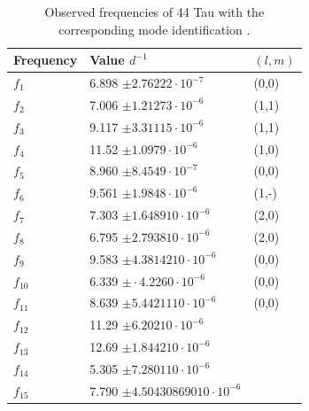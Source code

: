 \begin{table}[htbp]
	\centering
	\caption{Observed frequencies of 44 Tau with the corresponding mode identification \citep{lenz2010delta}. }
	\label{freqs}
\begin{tabular}{lll}
\toprule
  Frequency  &  Value $d^{-1}$  & $(l,m)$ \\ \midrule
$f_1$  & 6.898 $ \pm 2.76222 \cdot 10^{-7}$ & (0,0)    \\
$f_2$  & 7.006 $ \pm 1.21273 \cdot 10^{-6}$ & (1,1)    \\
$f_3$  & 9.117   $ \pm 3.31115 \cdot10^{-6}$ & (1,1)     \\
$f_4$  & 11.52   $ \pm 1.0979 \cdot 10^{-6}$ &  (1,0) \\
$f_5$  & 8.960  $ \pm 8.4549 \cdot 10^{-7}$ & (0,0)     \\
$f_6$  & 9.561   $ \pm  1.9848\cdot 10^{-6}$ &  (1,-)  \\
$f_7$  & 7.303  $ \pm  1.6489 10\cdot 10^{-6}$ &  (2,0) \\
$f_8$  & 6.795  $ \pm  2.7938 10\cdot 10^{-6}$  &  (2,0)    \\
$f_9$  & 9.583 $ \pm 4.38142 10\cdot 10^{-6}$ &  (0,0)   \\
$f_{10}$ & 6.339  $ \pm \cdot 4.2260 \cdot 10^{-6} $& (0,0)    \\
$f_{11}$ & 8.639  $ \pm  5.44211 10\cdot  10^{-6}$ &  (0,0)   \\
$f_{12}$ & 11.29 $ \pm     6.202 10\cdot 10^{-6} $ &    \\
$f_{13}$ & 12.69  $ \pm   1.8442 10\cdot 10^{-6} $&     \\
$f_{14}$ & 5.305 $ \pm   7.2801 10\cdot 10^{-6} $&      \\
$f_{15}$ & 7.790 $ \pm   4.504308690 10\cdot 10^{-6}$&  \\
             
\end{tabular}
\end{table}



